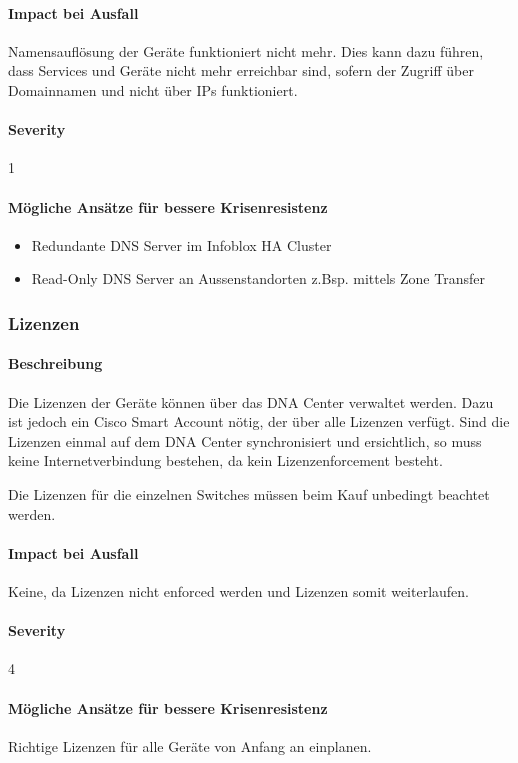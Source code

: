 \paragraph{Impact bei Ausfall}
Namensauflösung der Geräte funktioniert nicht mehr. Dies kann dazu führen, dass Services und Geräte nicht mehr erreichbar sind, sofern der Zugriff über Domainnamen und nicht über IPs funktioniert.

\paragraph{Severity} 1

\paragraph{Mögliche Ansätze für bessere Krisenresistenz}
\begin{itemize}
	\item Redundante DNS Server im Infoblox HA Cluster
	\item Read-Only DNS Server an Aussenstandorten z.Bsp. mittels Zone Transfer
\end{itemize}

\subsubsection{Lizenzen}
\paragraph{Beschreibung}
Die Lizenzen der Geräte können über das DNA Center verwaltet werden. Dazu ist jedoch ein Cisco Smart Account nötig, der über alle Lizenzen verfügt. Sind die Lizenzen einmal auf dem DNA Center synchronisiert und ersichtlich, so muss keine Internetverbindung bestehen, da kein Lizenzenforcement besteht.

Die Lizenzen für die einzelnen Switches müssen beim Kauf unbedingt beachtet werden.

\paragraph{Impact bei Ausfall}
Keine, da Lizenzen nicht enforced werden und Lizenzen somit weiterlaufen.

\paragraph{Severity} 4

\paragraph{Mögliche Ansätze für bessere Krisenresistenz}
Richtige Lizenzen für alle Geräte von Anfang an einplanen.

